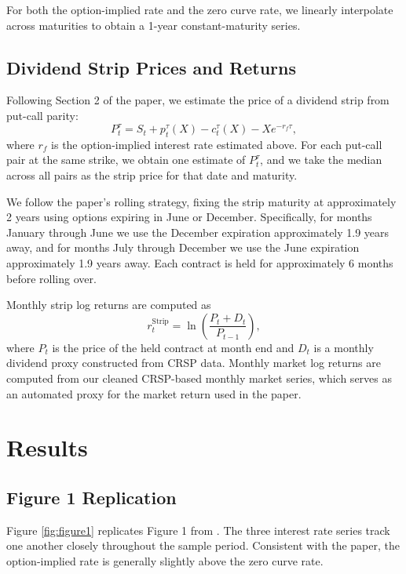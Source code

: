\documentclass[12pt]{article}
\begin{document}
For both the option-implied rate and the zero curve rate,
we linearly interpolate across maturities to obtain a 1-year constant-maturity series.

\subsection{Dividend Strip Prices and Returns}

Following Section 2 of the paper, we estimate the price of a dividend strip
from put-call parity:
\begin{equation}
P_t^{\tau} = S_t + p_t^{\tau}(X) - c_t^{\tau}(X) - X e^{-r_f \tau},
\end{equation}
where $r_f$ is the option-implied interest rate estimated above.
For each put-call pair at the same strike, we obtain one estimate of $P_t^{\tau}$,
and we take the median across all pairs as the strip price for that date and maturity.

We follow the paper's rolling strategy, fixing the strip maturity at approximately
2 years using options expiring in June or December.
Specifically, for months January through June we use the December expiration
approximately 1.9 years away, and for months July through December we use
the June expiration approximately 1.9 years away.
Each contract is held for approximately 6 months before rolling over.

Monthly strip log returns are computed as
\begin{equation}
r_t^{\text{Strip}} = \ln\left(\frac{P_t + D_t}{P_{t-1}}\right),
\end{equation}
where $P_t$ is the price of the held contract at month end and $D_t$ is a monthly
dividend proxy constructed from CRSP data.
Monthly market log returns are computed from our cleaned CRSP-based monthly market series,
which serves as an automated proxy for the market return used in the paper.

\section{Results}

\subsection{Figure 1 Replication}

Figure \ref{fig:figure1} replicates Figure 1 from \cite{golez2024holding}.
The three interest rate series track one another closely throughout the sample period.
Consistent with the paper, the option-implied rate is generally slightly above
the zero curve rate.
\end{document}
